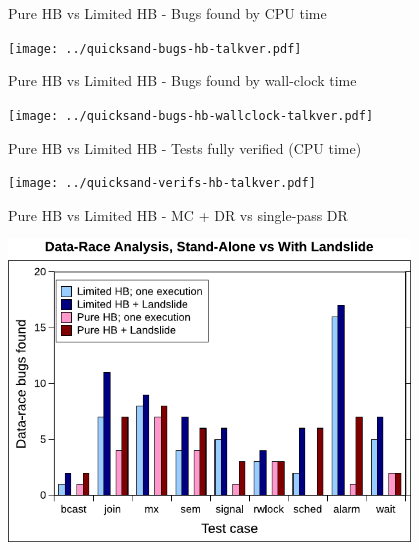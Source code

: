 \documentclass[xcolor=dvipsnames]{beamer}
\begin{document}
\begin{frame}{Pure HB vs Limited HB - Bugs found by CPU time}
	\begin{center}
		\texttt{[image: ../quicksand-bugs-hb-talkver.pdf]}
	\end{center}
\end{frame}
\begin{frame}{Pure HB vs Limited HB - Bugs found by wall-clock time}
	\begin{center}
		\texttt{[image: ../quicksand-bugs-hb-wallclock-talkver.pdf]}
	\end{center}
\end{frame}
\begin{frame}{Pure HB vs Limited HB - Tests fully verified (CPU time)}
	\begin{center}
		\texttt{[image: ../quicksand-verifs-hb-talkver.pdf]}
	\end{center}
\end{frame}
\begin{frame}{Pure HB vs Limited HB - MC + DR vs single-pass DR}
	\begin{center}
		\includegraphics[width=0.8\textwidth]{../../oopsla/dr-false-negatives-poster.pdf}
	\end{center}
\end{frame}
\end{document}
